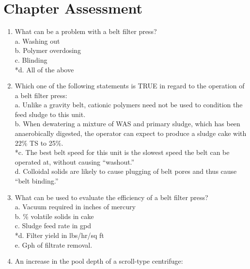 \section*{Chapter Assessment}
\begin{tcolorbox}[breakable, enhanced,
colframe=blue!25,
colback=blue!10,
coltitle=blue!20!black,  
title= Chapter Assessment]

\begin{enumerate}

\item  What can be a problem with a belt filter press? \\

a. Washing out \\
b. Polymer overdosing \\
c. Blinding \\
*d. All of the above \\

\item  Which one of the following statements is TRUE in regard to the operation of a belt filter press: \\

a. Unlike a gravity belt, cationic polymers need not be used to condition the feed sludge to this unit. \\
b. When dewatering a mixture of WAS and primary sludge, which has been anaerobically digested, the operator can expect to produce a sludge cake with 22\% TS to 25\%. \\
*c. The best belt speed for this unit is the slowest speed the belt can be operated at, without causing “washout.” \\
d. Colloidal solids are likely to cause plugging of belt pores and thus cause “belt binding.” \\

\item  What can be used to evaluate the efficiency of a belt filter press? \\

a. Vacuum required in inches of mercury \\
b. \% volatile solids in cake \\
c. Sludge feed rate in gpd \\
*d. Filter yield in lbs/hr/sq ft \\
e. Gph of filtrate removal. \\

\item  An increase in the pool depth of a scroll-type centrifuge: \\


\end{enumerate}
\end{tcolorbox}
